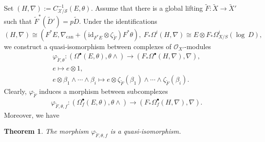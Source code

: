 \documentclass[12pt, a4paper]{article}
\newtheorem{theorem}{Theorem}[section]
\begin{document}
Set $(H,\nabla):=C^{-1}_{\mathcal X/\mathcal S}(E,\theta)$. Assume that there is a global lifting $\tilde F:\tilde X\to\tilde X'$ such that $\tilde F^*(\tilde D')=p\tilde D$. Under the identifications
$$
(H,\nabla)\cong(F^*E,\nabla_\mathrm{can}+(\mathrm{id}_{F^*E}\otimes\zeta_{\tilde F})F^*\theta),~F_*\Omega^i(H,\nabla)\cong E\otimes F_*\Omega^i_{X/S}(\mathrm{\log}~D),
$$
we construct a quasi-isomorphism between complexes of $\mathcal O_{X'}$-modules
$$
\begin{array}{c}
\varphi_{\tilde F,\theta}:(\Omega^\bullet(E,\theta),\theta\wedge)\to (F_*\Omega^\bullet(H,\nabla),\nabla),\\
e\mapsto e\otimes 1,
\\e\otimes\beta_1\wedge\cdots\wedge\beta_i\mapsto e\otimes\zeta_{\tilde F}(\beta_1)\wedge\cdots\wedge\zeta_{\tilde F}(\beta_i).
\end{array}
$$
Clearly, $\varphi_{\tilde F}$ induces a morphism between subcomplexes
\begin{eqnarray}\label{Cartier iso Kontesvich}
\varphi_{\tilde F,\theta,f}:(\Omega^\bullet_f(E,\theta),\theta\wedge)\to (F_*\Omega_f^\bullet(H,\nabla),\nabla).
\end{eqnarray}
Moreover, we have
\begin{theorem}\label{Cartier iso f}
The morphism $\varphi_{\tilde F,\theta,f}$
is a quasi-isomorphism.
\end{theorem}
\end{document}
